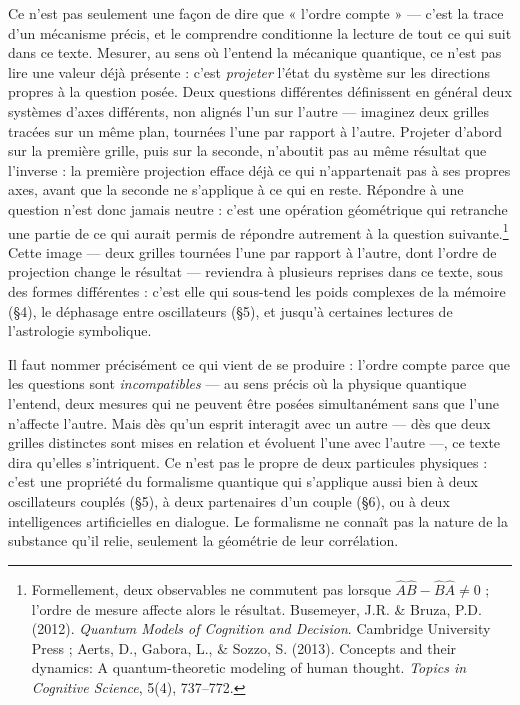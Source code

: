 \documentclass[french, 11pt, twoside, openright, a5paper]{book}
\begin{document}
Ce n'est pas seulement une façon de dire que « l'ordre compte » ---
c'est la trace d'un mécanisme précis, et le comprendre conditionne la
lecture de tout ce qui suit dans ce texte. Mesurer, au sens où l'entend
la mécanique quantique, ce n'est pas lire une valeur déjà présente :
c'est \emph{projeter} l'état du système sur les directions propres à la
question posée. Deux questions différentes définissent en général deux
systèmes d'axes différents, non alignés l'un sur l'autre --- imaginez
deux grilles tracées sur un même plan, tournées l'une par rapport à
l'autre. Projeter d'abord sur la première grille, puis sur la seconde,
n'aboutit pas au même résultat que l'inverse : la première projection
efface déjà ce qui n'appartenait pas à ses propres axes, avant que la
seconde ne s'applique à ce qui en reste. Répondre à une question n'est
donc jamais neutre : c'est une opération géométrique qui retranche une
partie de ce qui aurait permis de répondre autrement à la question
suivante.\footnote{Formellement, deux observables ne commutent pas lorsque $\hat{A}\hat{B} - \hat{B}\hat{A} \neq 0$ ; l'ordre de mesure affecte alors le résultat. Busemeyer, J.R. \& Bruza, P.D. (2012). \emph{Quantum Models of Cognition and Decision}. Cambridge University Press ; Aerts, D., Gabora, L., \& Sozzo, S. (2013). Concepts and their dynamics: A quantum-theoretic modeling of human thought. \emph{Topics in Cognitive Science}, 5(4), 737--772.} Cette image --- deux grilles tournées l'une par rapport à
l'autre, dont l'ordre de projection change le résultat --- reviendra à
plusieurs reprises dans ce texte, sous des formes différentes : c'est
elle qui sous-tend les poids complexes de la mémoire (§4), le déphasage
entre oscillateurs (§5), et jusqu'à certaines lectures de l'astrologie
symbolique.

Il faut nommer précisément ce qui vient de se produire : l'ordre compte
parce que les questions sont \emph{incompatibles} --- au sens précis où
la physique quantique l'entend, deux mesures qui ne peuvent être posées
simultanément sans que l'une n'affecte l'autre. Mais dès qu'un esprit
interagit avec un autre --- dès que deux grilles distinctes sont mises
en relation et évoluent l'une avec l'autre ---, ce texte dira qu'elles
s'intriquent. Ce n'est pas le propre de deux particules physiques :
c'est une propriété du formalisme quantique qui s'applique aussi bien à
deux oscillateurs couplés (§5), à deux partenaires d'un couple (§6), ou
à deux intelligences artificielles en dialogue. Le formalisme ne connaît
pas la nature de la substance qu'il relie, seulement la géométrie de
leur corrélation.
\end{document}
